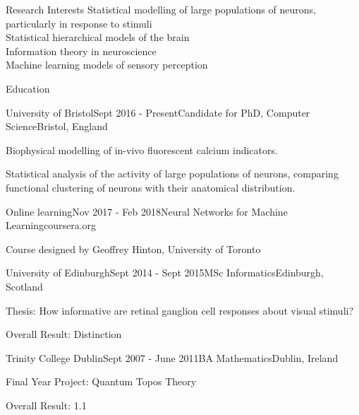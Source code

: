 \documentclass{resume} %
\begin{document}

\begin{rSection}{Research Interests}
  Statistical modelling of large populations of neurons, particularly in response to stimuli \\
  Statistical hierarchical models of the brain \\
  Information theory in neuroscience \\
  Machine learning models of sensory perception 
\end{rSection}


\begin{rSection}{Education}
  \begin{rSubsection}{University of Bristol}{Sept 2016 - Present}{Candidate for PhD, Computer Science}{Bristol, England}
    \item Biophysical modelling of in-vivo fluorescent calcium indicators.
    \item Statistical analysis of the activity of large populations of neurons, comparing functional clustering of neurons with their anatomical distribution.
  \end{rSubsection}
  
  \begin{rSubsection}{Online learning}{Nov 2017 - Feb 2018}{Neural Networks for Machine Learning}{coursera.org}
    \item Course designed by Geoffrey Hinton, University of Toronto 
  \end{rSubsection}

  \begin{rSubsection}{University of Edinburgh}{Sept 2014 - Sept 2015}{MSc Informatics}{Edinburgh, Scotland}
    \item Thesis: How informative are retinal ganglion cell responses about visual stimuli?
    \item Overall Result: Distinction
  \end{rSubsection}

  \begin{rSubsection}{Trinity College Dublin}{Sept 2007 - June 2011}{BA Mathematics}{Dublin, Ireland}
    \item Final Year Project: Quantum Topos Theory 
    \item Overall Result: 1.1
  \end{rSubsection}

\end{rSection}
\end{document}
